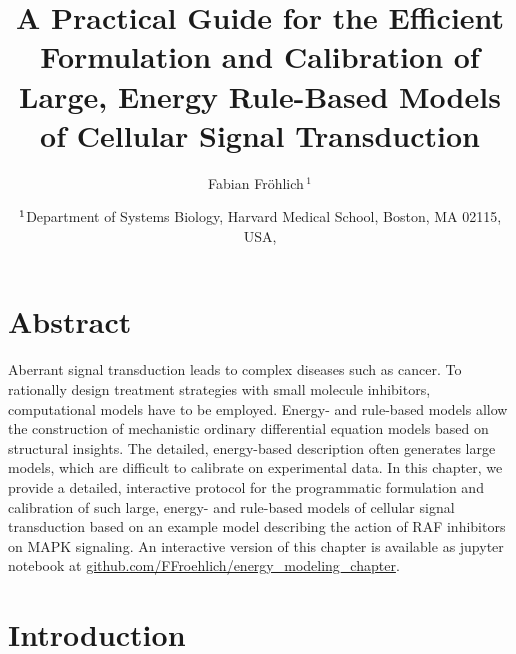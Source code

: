 \documentclass[11pt]{article}
\title{A Practical Guide for the Efficient Formulation and Calibration
of Large, Energy Rule-Based Models of Cellular Signal
Transduction}
\author{
Fabian Fr\"ohlich\,$^{\text{1}}$
}
\date{%
$^{\text{\sf 1}}$Department of Systems Biology, Harvard Medical School, Boston, MA 02115, USA,\\
}
\begin{document}
    
    \maketitle
    
    

    \hypertarget{abstract}{%
\section*{Abstract}\label{abstract}}

    Aberrant signal transduction leads to complex diseases such as cancer.
To rationally design treatment strategies with small molecule
inhibitors, computational models have to be employed. Energy- and
rule-based models allow the construction of mechanistic ordinary
differential equation models based on structural insights. The detailed,
energy-based description often generates large models, which are
difficult to calibrate on experimental data. In this chapter, we provide
a detailed, interactive protocol for the programmatic formulation and
calibration of such large, energy- and rule-based models of cellular
signal transduction based on an example model describing the action of
RAF inhibitors on MAPK signaling. An interactive version of this chapter
is available as jupyter notebook at
\href{https:://github.com/FFroehlich/energy_modeling_chapter}{github.com/FFroehlich/energy\_modeling\_chapter}.

    \hypertarget{introduction}{%
\section{Introduction}\label{introduction}}
\end{document}
